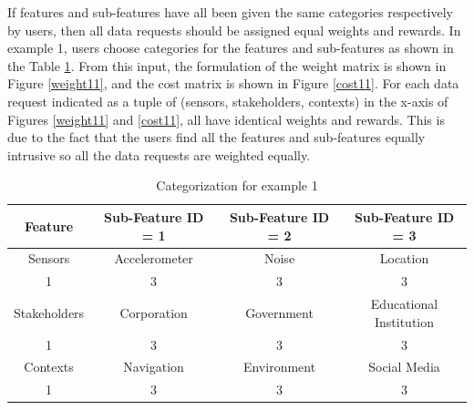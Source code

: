 If features and sub-features have all been given the same categories respectively by users, then all data requests should be assigned equal weights and rewards. In example 1, users choose categories for the features and sub-features as shown in the Table \ref{tab:scenario11}. From this input, the formulation of the weight matrix is shown in Figure \ref{weight11}, and the cost matrix is shown in Figure \ref{cost11}.
For each data request indicated as a tuple of (sensors, stakeholders, contexts) in the x-axis of Figures \ref{weight11} and \ref{cost11}, all have identical weights and rewards. This is due to the fact that the users find all the features and sub-features equally intrusive so all the data requests are weighted equally.

\begin{table}[h!]
  \centering
  \caption{Categorization for example 1}
  \label{tab:scenario11}
  \begin{tabular}{cccc}
    \toprule
    Feature & Sub-Feature ID = 1 & Sub-Feature ID = 2 & Sub-Feature ID = 3\\
    \midrule
    Sensors & Accelerometer & Noise & Location\\
     1 & 3 & 3 & 3\\ \hhline{====}
     Stakeholders & Corporation & Government & Educational Institution\\
     1 & 3 & 3 & 3\\ \hhline{====}
     Contexts & Navigation & Environment & Social Media\\
     1 & 3 & 3 & 3\\ 
    \bottomrule
  \end{tabular}
\end{table}
 
